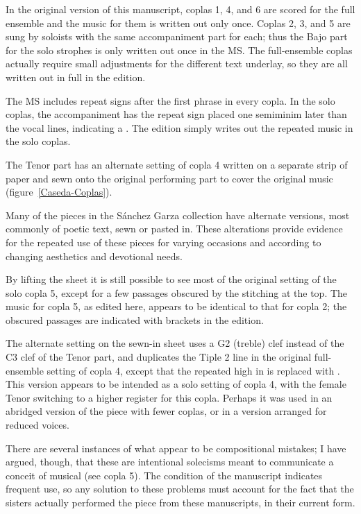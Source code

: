 
In the original version of this manuscript, coplas 1, 4, and 6 are scored for 
the full ensemble and the music for them is written out only once.
Coplas 2, 3, and 5 are sung by soloists with the same accompaniment part for 
each; thus the Bajo part for the solo strophes is only written out once in the 
MS.
The full-ensemble coplas actually require small adjustments for the different 
text underlay, so they are all written out in full in the edition.

The MS includes repeat signs after the first phrase in every copla. 
In the solo coplas, the accompaniment has the repeat sign placed one semiminim 
later than the vocal lines, indicating a .
The edition simply writes out the repeated music in the solo coplas.

The Tenor part has an alternate setting of copla 4 written on a separate strip
of paper and sewn onto the original performing part to cover the original
music (figure~\ref{Caseda-Coplas}).%
  \begin{Footnote}
      Many of the pieces in the Sánchez Garza collection have alternate 
      versions, most commonly of poetic text, sewn or pasted in. 
      These alterations provide evidence for the repeated use of these pieces
      for varying occasions and according to changing aesthetics and devotional
      needs.
  \end{Footnote}
By lifting the sheet it is still possible to see most of the original setting 
of the solo copla 5, except for a few passages obscured by the stitching at the 
top.
The music for copla 5, as edited here, appears to be identical to that for 
copla 2; the obscured passages are indicated with brackets in the edition.

The alternate setting on the sewn-in sheet uses a G2 (treble) clef instead of
the C3 clef of the Tenor part, and duplicates the Tiple 2 line in the original
full-ensemble setting of copla 4, except that the repeated high  in 
 is replaced with .
This version appears to be intended as a solo setting of copla 4, with the 
female Tenor switching to a higher register for this copla. 
Perhaps it was used in an abridged version of the piece with fewer coplas, or 
in a version arranged for reduced voices.



There are several instances of what appear to be compositional mistakes; 
I have argued, though, that these are intentional solecisms meant to communicate
a conceit of musical  (see copla 5).%
    \Autocite[375--403]{Cashner:PhD}
The condition of the manuscript indicates frequent use, so any solution to 
these problems must account for the fact that the sisters actually performed 
the piece from these manuscripts, in their current form.

